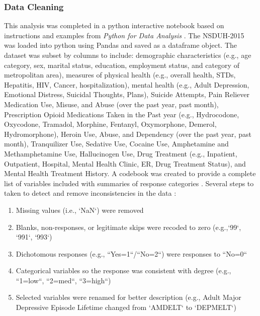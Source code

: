 \documentclass[sigconf]{acmart}
\begin{document}
\subsubsection{Data Cleaning}
This analysis was completed in a python interactive notebook \cite{data17} 
based on instructions and examples from \emph{Python for Data Analysis}
\cite{mckinney17}. The NSDUH-2015 was loaded into python using Pandas and 
saved as a dataframe object. The dataset was subset by columns to include: 
demographic characteristics (e.g., age category, sex, marital status, education, 
employment status, and category of metropolitan area), measures of physical 
health (e.g., overall health, STDs, Hepatitis, HIV, Cancer, hospitalization), 
mental health (e.g., Adult Depression, Emotional Distress, Suicidal Thoughts, 
Plans), Suicide Attempts, Pain Reliever Medication Use, Misuse, and Abuse
(over the past year, past month), Prescription Opioid Medications Taken in
the Past year (e.g., Hydrocodone, Oxycodone, Tramadol, Morphine, Fentanyl,
Oxymorphone, Demerol, Hydromorphone), Heroin Use, Abuse, and Dependency
(over the past year, past month), Tranquilizer Use, Sedative Use, Cocaine 
Use, Amphetamine and Methamphetamine Use, Hallucinogen Use, Drug Treatment
(e.g., Inpatient, Outpatient, Hospital, Mental Health Clinic, ER, Drug
Treatment Status), and Mental Health Treatment History. A codebook was 
created to provide a complete list of variables included with summaries 
of response categories \cite{codebook17}. Several steps to taken to detect 
and remove inconsistencies in the data \cite{rahm00}: 
\begin{enumerate}
  \item Missing values (i.e., `NaN`) were removed 
  \item Blanks, non-responses, or legitimate skips were recoded to zero 
  (e.g.,`99`, `991`, `993`) 
  \item Dichotomous responses (e.g., ``Yes=1``/``No=2``) were responses to 
  ``No=0``
  \item Categorical variables so the response was consistent with degree 
  (e.g., ``1=low``, ``2=med``, ``3=high``)
   \item Selected variables were renamed for better description (e.g., 
   Adult Major Depressive Episode Lifetime changed from `AMDELT` to `DEPMELT`)
\end{enumerate}
\end{document}
